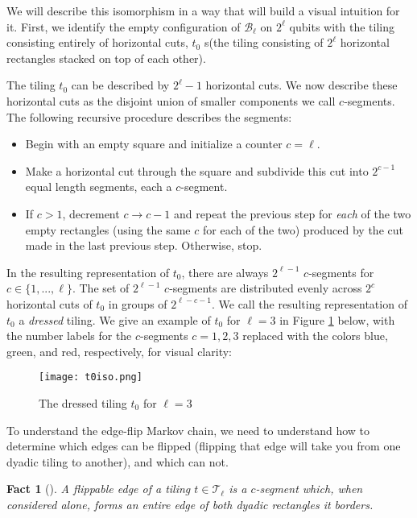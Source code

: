\documentclass[11pt,letterpaper]{article}
\newtheorem{fact}[theorem]{Fact}
\theoremstyle{definition}
\theoremstyle{remark}
\newcommand{\cB}{\mathcal B}
\newcommand{\cT}{\mathcal T}
\numberwithin{equation}{section}
\theoremstyle{definition}
\begin{document}
We will describe this isomorphism in a way that will build a visual intuition for it. First, we identify the empty configuration of $\cB_{\ell}$ on $2^{\ell}$ qubits with the tiling consisting entirely of horizontal cuts, $t_0$ s(the tiling consisting of $2^{\ell}$ horizontal rectangles stacked on top of each other). 

The tiling $t_0$ can be described by $2^\ell - 1$ horizontal cuts. We now describe these horizontal cuts as the disjoint union of smaller components we call $c$-segments. The following recursive procedure describes the segments:
\begin{itemize}
  \item Begin with an empty square and initialize a counter $c=\ell$.
  \item Make a horizontal cut through the square and subdivide this cut into $2^{c-1}$ equal length segments, each a $c$-segment.
  \item If $c > 1$, decrement $c\to c-1$ and repeat the previous step for \emph{each} of the two empty rectangles (using the same $c$ for each of the two) produced by the cut made in the last previous step. Otherwise, stop.
\end{itemize}

In the resulting representation of $t_0$, there are always $2^{\ell-1}$ $c$-segments for $c\in \{1,...,\ell\}$. The set of $2^{\ell-1}$ $c$-segments are distributed evenly across $2^c$ horizontal cuts of $t_0$ in groups of $2^{\ell-c-1}$. We call the resulting representation of $t_0$ a \emph{dressed} tiling. We give an example of $t_0$ for $\ell=3$ in Figure \ref{fig:vdi} below, with the number labels for the $c$-segments $c=1,2,3$ replaced with the colors blue, green, and red, respectively, for visual clarity:

\begin{figure}[h]
\begin{center}
\texttt{[image: t0iso.png]}
\end{center}
\caption{The dressed tiling $t_0$ for $\ell=3$}
\label{fig:vdi}
\end{figure}

To understand the edge-flip Markov chain, we need to understand how to determine which edges can be flipped (flipping that edge will take you from one dyadic tiling to another), and which can not.

\begin{fact}[\cite{cannon_et_al:LIPIcs:2017:7583}]
  A \emph{flippable} edge of a tiling $t\in \cT_{\ell}$ is a \emph{$c$-segment} which, when considered alone, forms an entire edge of \emph{both} dyadic rectangles it borders.
\end{fact}
\end{document}
